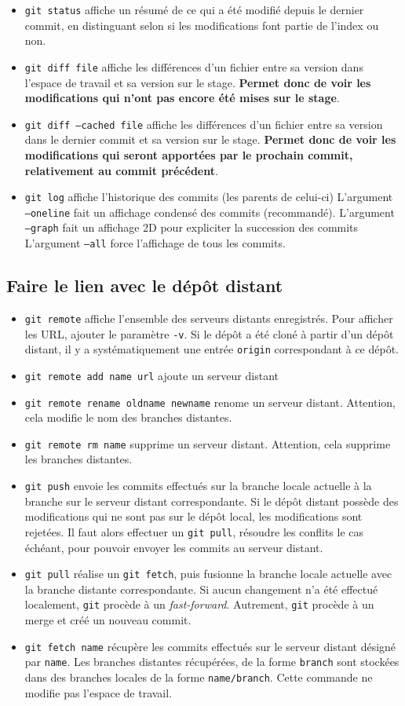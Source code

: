 \documentclass[french]{report}
\newcommand\itemb{\item[$\bullet$]}
\begin{document}
\begin{itemize}
    \itemb \texttt{git status} affiche un résumé de ce qui a été modifié depuis le dernier commit, en distinguant selon si les modifications font partie de l'index ou non.
    \itemb \texttt{git diff file} affiche les différences d'un fichier entre sa version dans l'espace de travail et sa version sur le stage.
    \textbf{Permet donc de voir les modifications qui n'ont pas encore été mises sur le stage}.
    \itemb \texttt{git diff ---cached file} affiche les différences d'un fichier entre sa version dans le dernier commit et sa version sur le stage.
    \textbf{Permet donc de voir les modifications qui seront apportées par le prochain commit, relativement au commit précédent}.
    \itemb \texttt{git log} affiche l'historique des commits (les parents de celui-ci)
    L'argument \texttt{---oneline} fait un affichage condensé des commits (recommandé).
    L'argument \texttt{---graph} fait un affichage 2D pour expliciter la succession des commits
    L'argument \texttt{---all} force l'affichage de tous les commits.
\end{itemize}

\subsection{Faire le lien avec le dépôt distant}

\begin{itemize}
    \itemb \texttt{git remote} affiche l'ensemble des serveurs distants enregistrés.
    Pour afficher les URL, ajouter le paramètre \texttt{-v}.
    Si le dépôt a été cloné à partir d'un dépôt distant, il y a systématiquement une entrée \texttt{origin} correspondant à ce dépôt.
    \itemb \texttt{git remote add name url} ajoute un serveur distant
    \itemb \texttt{git remote rename oldname newname} renome un serveur distant.
    Attention, cela modifie le nom des branches distantes.
    \itemb \texttt{git remote rm name} supprime un serveur distant.
    Attention, cela supprime les branches distantes.
    \itemb \texttt{git push} envoie les commits effectués sur la branche locale actuelle à la branche sur le serveur distant correspondante.
    Si le dépôt distant possède des modifications qui ne sont pas sur le dépôt local, les modifications sont rejetées.
    Il faut alors effectuer un \texttt{git pull}, résoudre les conflits le cas échéant, pour pouvoir envoyer les commits au serveur distant.
    \itemb \texttt{git pull} réalise un \texttt{git fetch}, puis fusionne la branche locale actuelle avec la branche distante correspondante.
    Si aucun changement n'a été effectué localement, \texttt{git} procède à un \textit{fast-forward}.
    Autrement, \texttt{git} procède à un merge et créé un nouveau commit.
    \itemb \texttt{git fetch name} récupère les commits effectués sur le serveur distant désigné par \texttt{name}.
    Les branches distantes récupérées, de la forme \texttt{branch} sont stockées dans des branches locales de la forme \texttt{name/branch}.
    Cette commande ne modifie pas l'espace de travail.
\end{itemize}
\end{document}
